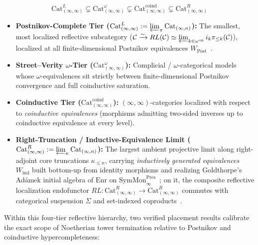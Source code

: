 \documentclass[10pt,twoside,openright]{book}
\theoremstyle{crmplain}
\theoremstyle{crmdef}
\theoremstyle{crmremark}
\begin{document}
\[
  \mathrm{Cat}^L_{(\infty, \infty)} \subsetneq \mathrm{Cat}^\omega_{(\infty, \infty)} \subsetneq \mathrm{Cat}^{\mathrm{coind}}_{(\infty, \infty)} \subsetneq \mathrm{Cat}^R_{(\infty, \infty)}
\]

\begin{itemize}[leftmargin=1.5em]

  \item \textbf{Postnikov-Complete Tier ($\mathrm{Cat}^L_{(\infty, \infty)} := \varprojlim_\pi \mathrm{Cat}_{(\infty, n)}$):} The smallest, most localized reflective subcategory ($\mathcal{C} \xrightarrow{\sim} RL(\mathcal{C}) \simeq \varprojlim_{k \in \omega^{\mathrm{op}}} i_k \pi_{\le k}(\mathcal{C})$), localized at all finite-dimensional Postnikov equivalences $W_{\mathrm{Post}}$~\cite{ORW26,GepnerHeine26}.

  \item \textbf{Street--Verity $\omega$-Tier ($\mathrm{Cat}^\omega_{(\infty, \infty)}$):} Complicial / $\omega$-categorical models whose $\omega$-equivalences sit strictly between finite-dimensional Postnikov convergence and full coinductive saturation.

  \item \textbf{Coinductive Tier ($\mathrm{Cat}^{\mathrm{coind}}_{(\infty, \infty)}$):} $(\infty, \infty)$-categories localized with respect to \emph{coinductive equivalences} (morphisms admitting two-sided inverses up to coinductive equivalence at every level).

  \item \textbf{Right-Truncation / Inductive-Equivalence Limit ($\mathrm{Cat}^R_{(\infty, \infty)} := \varprojlim_\kappa \mathrm{Cat}_{(\infty, n)}$):} The largest ambient projective limit along right-adjoint core truncations $\kappa_{\le n}$, carrying \emph{inductively generated equivalences} $W_{\mathrm{ind}}$ built bottom-up from identity morphisms and realizing Goldthorpe's Ad\'amek initial algebra of $\mathrm{Enr}$ on $\mathrm{SymMon}^{\mathrm{Pres}}_\infty$~\cite[Theorem~3.3.5]{Goldthorpe23}; on it, the composite reflective localization endofunctor $RL : \mathrm{Cat}^R_{(\infty, \infty)} \to \mathrm{Cat}^R_{(\infty, \infty)}$ commutes with categorical suspension $\Sigma$ and set-indexed coproducts~\cite{ORW26,GepnerHeine26}.

\end{itemize}

Within this four-tier reflective hierarchy, two verified placement results calibrate the exact scope of Noetherian tower termination relative to Postnikov and coinductive hypercompleteness:
\end{document}
